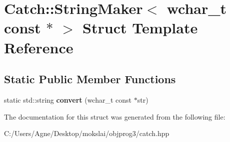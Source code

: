 \hypertarget{struct_catch_1_1_string_maker_3_01wchar__t_01const_01_5_01_4}{}\section{Catch\+:\+:String\+Maker$<$ wchar\+\_\+t const $\ast$ $>$ Struct Template Reference}
\label{struct_catch_1_1_string_maker_3_01wchar__t_01const_01_5_01_4}
\subsection*{Static Public Member Functions}
\begin{DoxyCompactItemize}
\item 
\mbox{\label{struct_catch_1_1_string_maker_3_01wchar__t_01const_01_5_01_4_ae7535a1f417ace45ca05e4389334ffeb}} 
static std\+::string {\bfseries convert} (wchar\+\_\+t const $\ast$str)
\end{DoxyCompactItemize}


The documentation for this struct was generated from the following file\+:\begin{DoxyCompactItemize}
\item 
C\+:/\+Users/\+Agne/\+Desktop/mokslai/objprog3/catch.\+hpp\end{DoxyCompactItemize}
